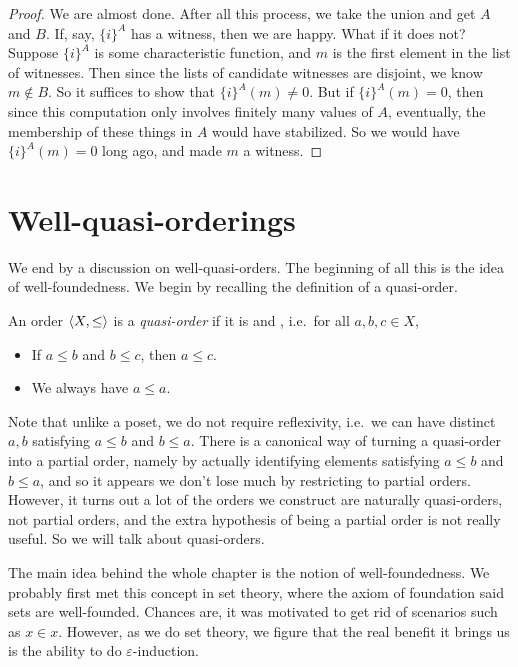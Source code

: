 \documentclass[a4paper]{article}
\begin{document}
\begin{proof}
  We are almost done. After all this process, we take the union and get $A$ and $B$. If, say, $\{i\}^A$ has a witness, then we are happy. What if it does not? Suppose $\{i\}^A$ is some characteristic function, and $m$ is the first element in the list of witnesses. Then since the lists of candidate witnesses are disjoint, we know $m \not \in B$. So it suffices to show that $\{i\}^A(m) \not= 0$. But if $\{i\}^{A}(m) = 0$, then since this computation only involves finitely many values of $A$, eventually, the membership of these things in $A$ would have stabilized. So we would have $\{i\}^{A}(m) = 0$ long ago, and made $m$ a witness.

\end{proof}

\section{Well-quasi-orderings}
We end by a discussion on well-quasi-orders. The beginning of all this is the idea of well-foundedness. We begin by recalling the definition of a quasi-order.

\begin{defi}
  An order $\langle X, \leq\rangle$ is a \emph{quasi-order} if it is  and , i.e.\ for all $a, b, c \in X$,
  \begin{itemize}
    \item If $a \leq b$ and $b \leq c$, then $a \leq c$.
    \item We always have $a \leq a$.
  \end{itemize}
\end{defi}
Note that unlike a poset, we do not require reflexivity, i.e.\ we can have distinct $a, b$ satisfying $a \leq b$ and $b \leq a$. There is a canonical way of turning a quasi-order into a partial order, namely by actually identifying elements satisfying $a \leq b$ and $b \leq a$, and so it appears we don't lose much by restricting to partial orders. However, it turns out a lot of the orders we construct are naturally quasi-orders, not partial orders, and the extra hypothesis of being a partial order is not really useful. So we will talk about quasi-orders.

The main idea behind the whole chapter is the notion of well-foundedness. We probably first met this concept in set theory, where the axiom of foundation said sets are well-founded. Chances are, it was motivated to get rid of scenarios such as $x \in x$. However, as we do set theory, we figure that the real benefit it brings us is the ability to do $\varepsilon$-induction.
\end{document}
